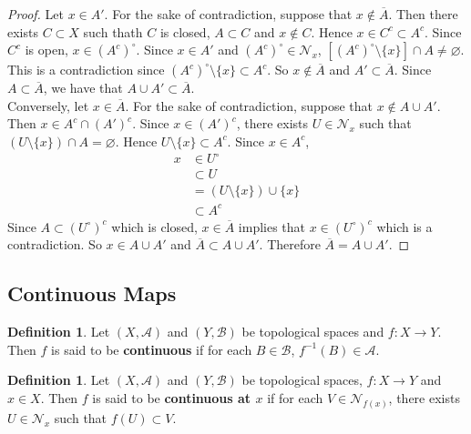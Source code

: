 \documentclass[12pt]{amsart}
\theoremstyle{definition}
\newtheorem{defn}[definition]{Definition}
\newcommand{\MA}{\mathcal{A}}
\newcommand{\MB}{\mathcal{B}}
\newcommand{\MN}{\mathcal{N}}
\newcommand{\ld}[1]{\label{defn:#1}}
\begin{document}
	\begin{proof}
	Let $x \in A'$. For the sake of contradiction, suppose that $x \not \in \overline{A}$. Then there exists $C \subset X$ such thath $C$ is closed, $A \subset C$ and $x \not \in C$. Hence $x \in C^c \subset A^c$. Since $C^c$ is open, $x \in (A^c)^{\circ}$. Since $x \in A'$ and $(A^c)^{\circ} \in \MN_x$, $[(A^c)^{\circ} \setminus \{x\}] \cap A \neq \varnothing$. This is a contradiction since $(A^c)^{\circ} \setminus \{x\} \subset A^c$. So $x \not \in \overline{A}$ and $A' \subset \overline{A}$. Since $A \subset \overline{A}$, we have that $A \cup A' \subset \overline{A} $.\\ Conversely, let $x \in \overline{A}$. For the sake of contradiction, suppose that $x \not \in A \cup A'$. Then $x \in A^c \cap (A')^c$. Since $x \in (A')^c$, there exists $U \in \MN_x$ such that $(U \setminus \{x\}) \cap A = \varnothing$. Hence $U \setminus \{x\} \subset A^c$. Since $x \in A^c$, 
	\begin{align*}
	x
	& \in U^{\circ} \\
	& \subset U \\ 
	&= (U \setminus \{x\}) \cup \{x\} \\
	& \subset A^c
\end{align*}	
	Since $A \subset (U^{\circ})^c$ which is closed, $x \in \overline{A}$ implies that $x \in (U^{\circ})^c$ which is a contradiction. So $x \in A \cup A'$ and $\overline{A} \subset A \cup A'$. Therefore $\overline{A} = A \cup A'$.
	\end{proof}
	
	
	
	
	
	
	
	
	
	
	
	
	
	
	
	
	
	
	
	
	\newpage
	\subsection{Continuous Maps}	
	
	\begin{defn} \ld{}
	Let $(X,\MA)$ and $(Y,\MB)$ be topological spaces and $f:X \rightarrow Y$. Then $f$ is said to be \textbf{continuous} if for each $B \in \MB$, $f^{-1}(B) \in \MA$.
	\end{defn}
	
	\begin{defn} \ld{}
	Let $(X,\MA)$ and $(Y,\MB)$ be topological spaces, $f:X \rightarrow Y$ and $x \in X$. Then $f$ is said to be \textbf{continuous at $x$} if for each $V \in \MN_{f(x)}$, there exists $U \in \MN_x$ such that $f(U) \subset V$. 
	\end{defn}		
	
\end{document}
